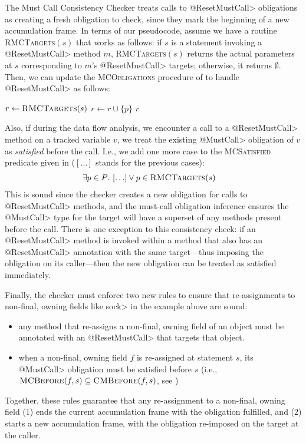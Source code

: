 The Must Call Consistency Checker treats calls to \<@ResetMustCall> obligations
as creating a fresh obligation to check, since they mark the beginning of a new
accumulation frame.  In terms of our pseudocode, assume we have a routine
\textsc{RMCTargets}$(s)$ that works as follows: if $s$ is a
statement invoking a \<@ResetMustCall> method $m$, \textsc{RMCTargets}$(s)$ returns
the actual parameters at $s$ corresponding to $m$'s \<@ResetMustCall> targets;
otherwise, it returns $\emptyset$.  Then, we can update the
\textsc{MCObligations} procedure of  to handle
\<@ResetMustCall> as follows:
\begin{algorithmic}
    \State $r \gets \textsc{RMCTargets}(s)$
      \State $r \gets r \cup \{p\}$
    \EndIf
    \State \Return $r$
    \EndProcedure
\end{algorithmic}
Also, if during the data flow analysis, we encounter a call to a \<@ResetMustCall>
method on a tracked variable $v$, we treat the existing \<@MustCall>
obligation of $v$ as \emph{satisfied} before the call.  I.e., we add one more
case to the \textsc{MCSatisfied} predicate given in
 ($[\ldots]$ stands for the previous cases):
\begin{align*}
  \exists p \in P &.\ [\ldots] \vee p \in \textsc{RMCTargets}(s)
\end{align*}
This is sound since the checker creates a new obligation for calls to
\<@ResetMustCall> methods, and the must-call obligation inference ensures the
\<@MustCall> type for the target will have a superset of any methods present
before the call.
There is one exception to this consistency check: if an \<@ResetMustCall>
method is invoked within a method that also has an \<@ResetMustCall> annotation
with the same target---thus imposing the obligation on its caller---then
the new obligation can be treated as satisfied immediately.

Finally, the checker must enforce two new rules to ensure that
re-assignments to non-final, owning fields like \<sock> in the example
above are sound:
\begin{itemize}
\item any method that re-assigns a non-final, owning field of an object
  must be annotated with an \<@ResetMustCall> that targets that object.
\item when a non-final, owning field $f$ is re-assigned at statement $s$, its \<@MustCall> obligation
must be satisfied before $s$ (i.e., $\textsc{MCBefore}(f,s) \subseteq
\textsc{CMBefore}(f,s)$, see )
\end{itemize}
\noindent
Together, these rules guarantee that any re-assignment to a non-final, owning
field (1) ends the current accumulation frame with the obligation fulfilled,
and (2) starts a new accumulation frame, with the obligation re-imposed on
the target at the caller.

